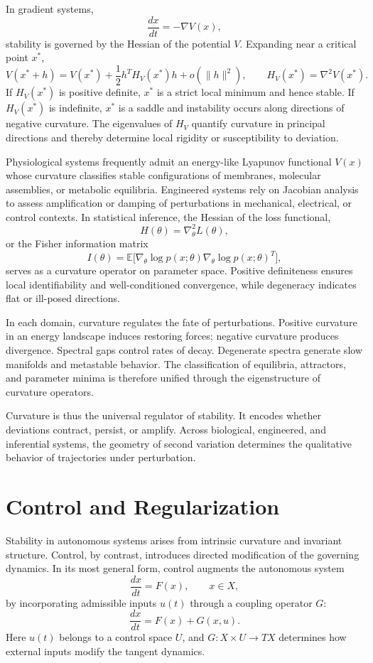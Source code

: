 \documentclass[12pt]{book}
\begin{document}
In gradient systems,
\[
\frac{dx}{dt} = -\nabla V(x),
\]
stability is governed by the Hessian of the potential $V$. Expanding near a critical point $x^*$,
\[
V(x^* + h)
=
V(x^*)
+
\frac{1}{2}
h^T H_V(x^*) h
+
o(\|h\|^2),
\qquad
H_V(x^*) = \nabla^2 V(x^*).
\]
If $H_V(x^*)$ is positive definite, $x^*$ is a strict local minimum and hence stable. If $H_V(x^*)$ is indefinite, $x^*$ is a saddle and instability occurs along directions of negative curvature. The eigenvalues of $H_V$ quantify curvature in principal directions and thereby determine local rigidity or susceptibility to deviation.

Physiological systems frequently admit an energy-like Lyapunov functional $V(x)$ whose curvature classifies stable configurations of membranes, molecular assemblies, or metabolic equilibria. Engineered systems rely on Jacobian analysis to assess amplification or damping of perturbations in mechanical, electrical, or control contexts. In statistical inference, the Hessian of the loss functional,
\[
H(\theta) = \nabla_\theta^2 L(\theta),
\]
or the Fisher information matrix
\[
I(\theta)
=
\mathbb{E}
\big[
\nabla_\theta \log p(x;\theta)
\nabla_\theta \log p(x;\theta)^T
\big],
\]
serves as a curvature operator on parameter space. Positive definiteness ensures local identifiability and well-conditioned convergence, while degeneracy indicates flat or ill-posed directions.

In each domain, curvature regulates the fate of perturbations. Positive curvature in an energy landscape induces restoring forces; negative curvature produces divergence. Spectral gaps control rates of decay. Degenerate spectra generate slow manifolds and metastable behavior. The classification of equilibria, attractors, and parameter minima is therefore unified through the eigenstructure of curvature operators.

Curvature is thus the universal regulator of stability. It encodes whether deviations contract, persist, or amplify. Across biological, engineered, and inferential systems, the geometry of second variation determines the qualitative behavior of trajectories under perturbation.

\section{Control and Regularization}

Stability in autonomous systems arises from intrinsic curvature and invariant structure. Control, by contrast, introduces directed modification of the governing dynamics. In its most general form, control augments the autonomous system
\[
\frac{dx}{dt} = F(x),
\qquad x \in X,
\]
by incorporating admissible inputs $u(t)$ through a coupling operator $G$:
\[
\frac{dx}{dt} = F(x) + G(x,u).
\]
Here $u(t)$ belongs to a control space $U$, and $G : X \times U \to TX$ determines how external inputs modify the tangent dynamics.
\end{document}
